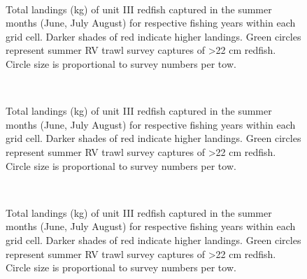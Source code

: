 \documentclass[11pt]{article}
\newcommand{\D}{.}
\newcommand{\e}{/home/ecomod_data/redfish/figures/}
\begin{document}
\begin{landscape}
\begin{figure}
\centering
{}
\\
\caption{Total landings (kg) of unit III redfish captured in the summer months (June, July August) for respective fishing years within each grid cell. Darker shades of red indicate higher landings. Green circles represent summer RV trawl survey captures of \textgreater 22 cm redfish. Circle size is proportional to survey numbers per tow.}
\end{figure}
\clearpage

\begin{figure}
\centering
{}
\\
\caption{Total landings (kg) of unit III redfish captured in the summer months (June, July August) for respective fishing years within each grid cell. Darker shades of red indicate higher landings. Green circles represent summer RV trawl survey captures of \textgreater 22 cm redfish. Circle size is proportional to survey numbers per tow.}
\end{figure}
\clearpage

\begin{figure}
\centering
{}
\\
\caption{Total landings (kg) of unit III redfish captured in the summer months (June, July August) for respective fishing years within each grid cell. Darker shades of red indicate higher landings. Green circles represent summer RV trawl survey captures of \textgreater 22 cm redfish. Circle size is proportional to survey numbers per tow.}
\end{figure}
\clearpage
\end{landscape}
\end{document}
